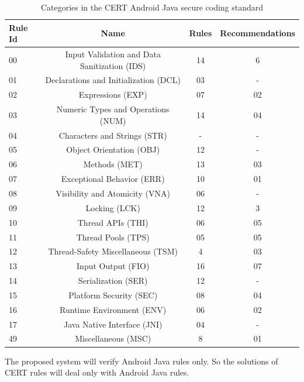  
 
 \begin{table}[h!]
 	\centering
 	
 	\label{tab:andrjava}
 	\begin{tabular}{|l|c|c|c|}
 		\hline
 		\textbf{Rule Id} & \textbf{Name} & \textbf{Rules} & \textbf{Recommendations}\\
 		\hline
 		
 		00 & Input Validation and Data Sanitization (IDS) & 14 & 6\\
 		\hline
 		
 		01 & Declarations and Initialization (DCL) & 03 & -\\
 		\hline
 		02 & Expressions (EXP) & 07 & 02\\
 		\hline
 		03 & Numeric Types and Operations (NUM) & 14 & 04\\
 		\hline
 		04 & Characters and Strings (STR) & - & -\\
 		\hline
 		05 & Object Orientation (OBJ) & 12 & -\\
 		\hline
 		06 & Methods (MET) & 13 & 03\\
 		\hline
 		07 & Exceptional Behavior (ERR) & 10 & 01\\
 		\hline
 		08 & Visibility and Atomicity (VNA) & 06 & -\\
 		\hline
 		09 & Locking (LCK) & 12 & 3\\
 		\hline
 		10 & Thread APIs (THI) & 06 & 05\\
 		\hline
 		11 & Thread Pools (TPS) & 05 & 05\\
 		\hline
 		12 & Thread-Safety Miscellaneous (TSM) & 4 & 03\\
 		\hline
 		13 & Input Output (FIO) & 16 & 07\\
 		\hline
 		14 & Serialization (SER) & 12 & -\\
 		\hline
 		15 & Platform Security (SEC) & 08 & 04\\
 		\hline
 		16 & Runtime Environment (ENV) & 06 & 02\\
 		\hline
 		17 & Java Native Interface (JNI) & 04 & -\\
 		\hline
 		49 & Miscellaneous (MSC) & 8 & 01\\
 		\hline
 		
 	\end{tabular}
 	\caption{Categories in the CERT Android Java secure coding standard}
 \end{table}
 

 
The proposed system will verify Android Java rules only. So the solutions of CERT rules will deal only with Android Java rules.

